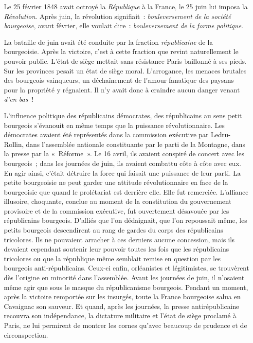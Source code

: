 \documentclass[french,twoside]{book} %
\newcommand\chaptercont{} %
\begin{document}
\chaptercont
\noindent Le 25 février 1848 avait octroyé la \emph{République} à la France, le 25 juin lui imposa la \emph{Révolution}. Après juin, la révolution signifiait : \emph{bouleversement de la société bourgeoise}, avant février, elle voulait dire : \emph{bouleversement de la forme politique}.\par
La bataille de juin avait été conduite par la fraction \emph{républicaine} de la bourgeoisie. Après la victoire, c’est à cette fraction que revint naturellement le pouvoir public. L’état de siège mettait sans résistance Paris baillonné à ses pieds. Sur les provinces pesait un état de siège moral. L’arrogance, les menaces brutales des bourgeois vainqueurs, un déchaînement de l’amour fanatique des paysans pour la propriété y régnaient. Il n’y avait donc à craindre aucun danger venant \emph{d’en-bas} !\par
L’influence politique des républicains démocrates, des républicains au sens petit bourgeois s’évanouit en même temps que la puissance révolutionnaire. Les démocrates avaient été représentés dans la commission exécutive par Ledru-Rollin, dans l’assemblée nationale constituante par le parti de la Montagne, dans la presse par la « Réforme ». Le 16 avril, ils avaient conspiré de concert avec les bourgeois ; dans les journées de juin, ils avaient combattu côte à côte avec eux. En agir ainsi, c’était détruire la force qui faisait une puissance de leur parti. La petite bourgeoisie ne peut garder une attitude révolutionnaire en face de la bourgeoisie que quand le prolétariat est derrière elle. Elle fut remerciée. L’alliance illusoire, choquante, conclue au moment de la constitution du gouvernement provisoire et de la commission exécutive, fut ouvertement désavouée par les républicains bourgeois. D’alliés que l’on dédaignait, que l’on repoussait même, les petits bourgeois descendirent au rang de gardes du corps des républicains tricolores. Ils ne pouvaient arracher à ces derniers aucune concession, mais ils devaient cependant soutenir leur pouvoir toutes les fois que les républicains tricolores ou que la république même semblait remise en question par les bourgeois anti-républicains. Ceux-ci enfin, orléanistes et légitimistes, se trouvèrent dès l’origine en minorité dans l’assemblée. Avant les journées de juin, il n’osaient même agir que sous le masque du républicanisme bourgeois. Pendant un moment, après la victoire remportée sur les insurgés, toute la France bourgeoise salua en Cavaignac son sauveur. Et quand, après les journées, la presse antirépublicaine recouvra son indépendance, la dictature militaire et l’état de siège proclamé à Paris, ne lui permirent de montrer les cornes qu’avec beaucoup de prudence et de circonspection.\par
\end{document}
